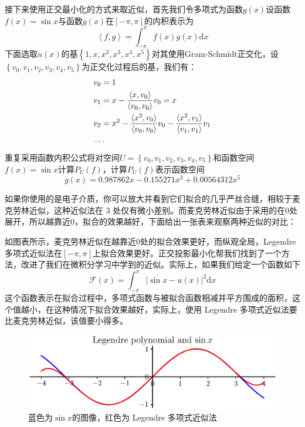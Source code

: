 接下来使用正交最小化的方式来取近似，首先我们令多项式为函数$g(x)$设函数$f(x)=\sin x$与函数$g(x)$在$\left[ -\pi,\pi \right]$的内积表示为$$\left \langle f,g \right \rangle =\int_{-\pi}^{\pi} f(x)g(x)\mathrm{d}x $$下面选取$u(x)$的基$\left\{ 1,x,x^2,x^3,x^4,x^5 \right\}$对其使用Gram-Schmidt正交化，设$\left\{ v_0,v_1,v_2,v_3,v_4,v_5 \right\}$为正交化过程后的基，我们有：
\begin{align}
	&v_0=1\\
	&v_1=x-\frac{\left \langle x,v_0 \right \rangle }{\left \langle v_0,v_0 \right \rangle }v_0=x\\
	&v_2 = x^2 - \frac{\langle x^2, v_0 \rangle}{\langle v_0, v_0 \rangle} v_0 - \frac{\langle x^2, v_1 \rangle}{\langle v_1, v_1 \rangle} v_1\\&\cdots\notag
\end{align}
重复采用函数内积公式将对空间$U=\left\{ v_0,v_1,v_2,v_3,v_4,v_5 \right\}$和函数空间$f(x)=\sin x$计算$P_U(f)$，计算$P_U(f)$表示函数空间$$g(x)=0.987862x-0.155271x^3+0.00564312x^5$$%

如果你使用的是电子介质，你可以放大并看到它们拟合的几乎严丝合缝，相较于麦克劳林近似，这种近似法在 3 处仅有微小差别。而麦克劳林近似由于采用的在0处展开，所以越靠近0，拟合的效果越好，下面给出一张表来观察两种近似的对比：

如图表所示，麦克劳林近似在越靠近0处的拟合效果更好，而纵观全局，Legendre 多项式近似法在$\left[ -\pi,\pi \right]$上拟合效果更好。正交投影最小化帮我们找到了一个方法，改进了我们在微积分学习中学到的近似。实际上，如果我们给定一个函数如下$$\mathcal{F}(x)=\int_{-\pi}^{\pi} \left | \sin x-u(x) \right |^2 \mathrm{d}x $$这个函数表示在拟合过程中，多项式函数与被拟合函数相减并平方围成的面积，这个值越小，在这种情况下拟合效果越好，实际上，使用 Legendre 多项式近似法要比麦克劳林近似，该值要小得多。

\begin{figure}[htbp]
	\centering
	\includegraphics[width=0.7\linewidth]{figure/eps/FunctionPolLegendre.eps}
	\caption{蓝色为$\sin x$的图像，红色为 Legendre 多项式近似法}
	\label{fig:PolLegendre}
\end{figure}

\begin{table}
	\centering
	\begin{minipage}[c]{\textwidth}
		
	\end{minipage}
\end{table}

